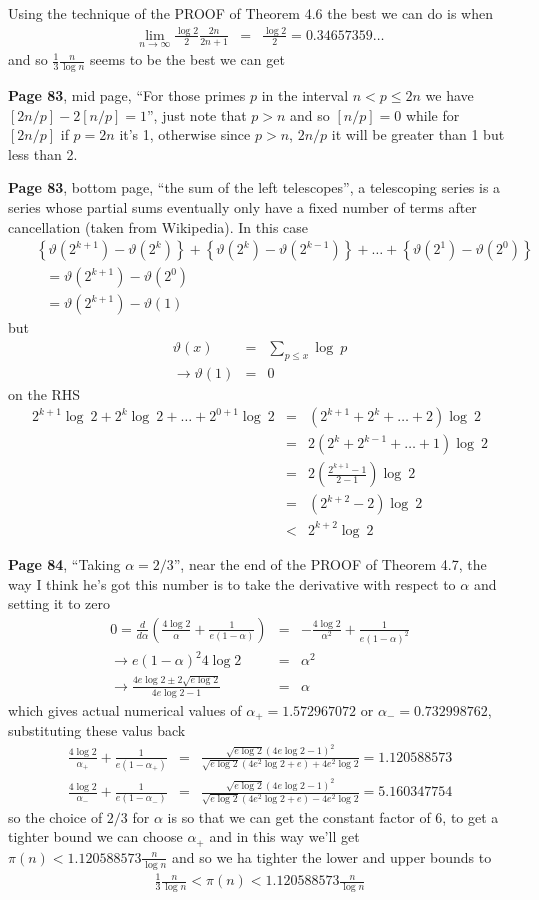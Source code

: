 \documentclass[aps,preprint,preprintnumbers,nofootinbib,showpacs,prd]{revtex4-1}
\newcommand{\nbea}{\begin{eqnarray*}}
\newcommand{\neea}{\end{eqnarray*}}
\begin{document}
Using the technique of the PROOF of Theorem 4.6 the best we can do is when
%
\nbea
\lim_{n\to\infty}\frac{\log2}{2}\frac{2n}{2n+1} & = & \frac{\log 2}{2} = 0.34657359\ldots
\neea
%
and so $\frac{1}{3}\frac{n}{\log n}$ seems to be the best we can get

{\bf Page 83}, mid page, ``For those primes $p$ in the interval $n < p \le 2n$ we have $\left\lbrack 2n/p\right\rbrack - 2\left\lbrack n/p\right\rbrack = 1$'', just note that $p > n$ and so $\left\lbrack n/p\right\rbrack=0$ while for $\left\lbrack 2n/p\right\rbrack$ if $p=2n$ it's 1, otherwise since $p > n$, $2n/p$ it will be greater than 1 but less than 2.

{\bf Page 83}, bottom page, ``the sum of the left telescopes'', a telescoping series is a series whose partial sums eventually only have a fixed number of terms after cancellation (taken from Wikipedia). In this case
%
\nbea
&& \left\{\vartheta(2^{k+1}) - \vartheta(2^k)\right\} + \left\{\vartheta(2^{k}) - \vartheta(2^{k-1})\right\} + \ldots + \left\{\vartheta(2^{1}) - \vartheta(2^0)\right\} \\
&& ~~~ = \vartheta(2^{k+1}) - \vartheta(2^0) \\
&& ~~~ = \vartheta(2^{k+1}) - \vartheta(1)
\neea
%
but
%
\nbea
\vartheta(x) & = & \sum_{p\le x} \log~p \\
\to \vartheta(1) & = & 0
\neea
%
on the RHS
%
\nbea
2^{k+1}\log~2 + 2^{k}\log~2 + \ldots + 2^{0+1}\log~2 & = & \left ( 2^{k+1} + 2^k + \ldots + 2\right )\log~2 \\
& = & 2\left ( 2^{k} + 2^{k-1} + \ldots + 1\right )\log~2 \\
& = & 2 \left ( \frac{2^{k+1}-1}{2-1}\right ) \log~2 \\
& = & (2^{k+2}-2) \log~2 \\
& < & 2^{k+2}\log~2
\neea
%

{\bf Page 84}, ``Taking $\alpha=2/3$'', near the end of the PROOF of Theorem 4.7, the way I think he's got this number is to take the derivative with respect to $\alpha$ and setting it to zero
%
\nbea
0 = \frac{d}{d\alpha}\left ( \frac{4\log 2}{\alpha} + \frac{1}{e(1-\alpha)}\right ) & = & -\frac{4\log 2}{\alpha^2} + \frac{1}{e(1-\alpha)^2} \\
\to e(1-\alpha)^2 4\log 2 & = & \alpha^2 \\
\to \frac{4e\log2 \pm 2\sqrt{e\log2}}{4e\log2-1} & = & \alpha
\neea
%
which gives actual numerical values of $\alpha_+=1.572967072$ or $\alpha_-=0.732998762$, substituting these valus back
%
\nbea
\frac{4\log 2}{\alpha_+} + \frac{1}{e(1-\alpha_+)} & = & \frac{\sqrt{e\log2}(4e\log2-1)^2}{\sqrt{e\log2}(4e^2\log2 + e) + 4e^2\log2} = 1.120588573\\
\frac{4\log 2}{\alpha_-} + \frac{1}{e(1-\alpha_-)} & = & \frac{\sqrt{e\log2}(4e\log2-1)^2}{\sqrt{e\log2}(4e^2\log2 + e) - 4e^2\log2} = 5.160347754
\neea
%
so the choice of $2/3$ for $\alpha$ is so that we can get the constant factor of $6$, to get a tighter bound we can choose $\alpha_+$ and in this way we'll get $\pi(n) < 1.120588573 \frac{n}{\log n}$ and so we ha tighter the lower and upper bounds to
%
\nbea
\frac{1}{3}\frac{n}{\log n} < \pi(n) < 1.120588573 \frac{n}{\log n}
\neea
%
\end{document}
